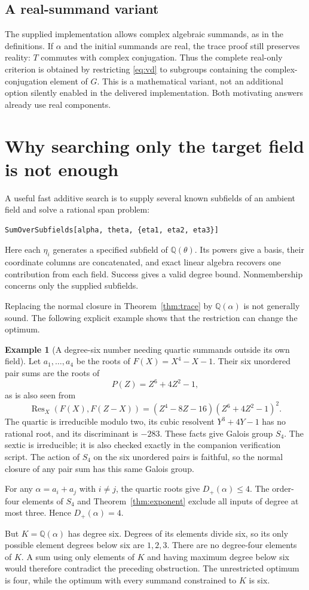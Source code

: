 \documentclass[11pt,a4paper]{article}
\newcommand{\Q}{\mathbb Q}
\newcommand{\Res}{\operatorname{Res}}
\newcommand{\dplus}{D_{+}}
\theoremstyle{definition}
\newtheorem{example}[theorem]{Example}
\theoremstyle{remark}
\begin{document}
\subsection{A real-summand variant}
The supplied implementation allows complex algebraic summands, as in the definitions. If $\alpha$ and the initial summands are real, the trace proof still preserves reality: $T$ commutes with complex conjugation. Thus the complete real-only criterion is obtained by restricting \eqref{eq:vd} to subgroups containing the complex-conjugation element of $G$. This is a mathematical variant, not an additional option silently enabled in the delivered implementation. Both motivating answers already use real components.

\section{Why searching only the target field is not enough}
\label{sec:subfields}
A useful fast additive search is to supply several known subfields of an ambient field and solve a rational span problem:
\begin{lstlisting}
SumOverSubfields[alpha, theta, {eta1, eta2, eta3}]
\end{lstlisting}
Here each $\eta_i$ generates a specified subfield of $\Q(\theta)$. Its powers give a basis, their coordinate columns are concatenated, and exact linear algebra recovers one contribution from each field. Success gives a valid degree bound. Nonmembership concerns only the supplied subfields.

Replacing the normal closure in Theorem~\ref{thm:trace} by $\Q(\alpha)$ is not generally sound. The following explicit example shows that the restriction can change the optimum.

\begin{example}[A degree-six number needing quartic summands outside its own field]
Let $a_1,\ldots,a_4$ be the roots of $F(X)=X^4-X-1$. Their six unordered pair sums are the roots of
\[
 P(Z)=Z^6+4Z^2-1,
\]
as is also seen from
\[
 \Res_X(F(X),F(Z-X))=(Z^4-8Z-16)(Z^6+4Z^2-1)^2.
\]
The quartic is irreducible modulo two, its cubic resolvent $Y^3+4Y-1$ has no rational root, and its discriminant is $-283$. These facts give Galois group $S_4$. The sextic is irreducible; it is also checked exactly in the companion verification script. The action of $S_4$ on the six unordered pairs is faithful, so the normal closure of any pair sum has this same Galois group.

For any $\alpha=a_i+a_j$ with $i\ne j$, the quartic roots give $\dplus(\alpha)\leq4$. The order-four elements of $S_4$ and Theorem~\ref{thm:exponent} exclude all inputs of degree at most three. Hence $\dplus(\alpha)=4$.

But $K=\Q(\alpha)$ has degree six. Degrees of its elements divide six, so its only possible element degrees below six are $1,2,3$. There are no degree-four elements of $K$. A sum using only elements of $K$ and having maximum degree below six would therefore contradict the preceding obstruction. The unrestricted optimum is four, while the optimum with every summand constrained to $K$ is six.
\end{example}
\end{document}

